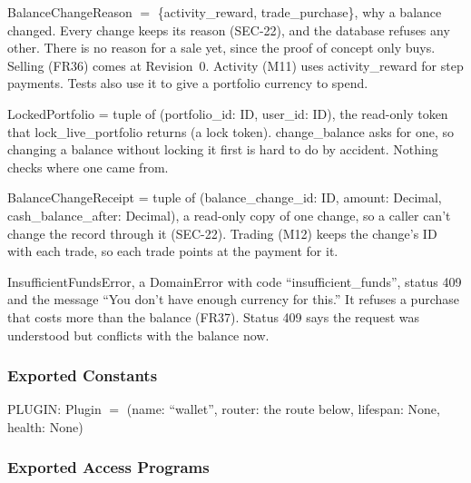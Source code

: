 \documentclass[12pt, titlepage]{article}
\begin{document}
\noindent BalanceChangeReason $=$ \{activity\_reward, trade\_purchase\}, why a
balance changed. Every change keeps its reason (SEC-22), and the database
refuses any other. There is no reason for a sale yet, since the proof of
concept only buys. Selling (FR36) comes at Revision~0. Activity (M11) uses
activity\_reward for step payments. Tests also use it to give a portfolio
currency to spend.

\medskip
{\raggedright
\noindent LockedPortfolio = tuple of (portfolio\_id: ID, user\_id: ID), the
read-only token that lock\_live\_portfolio returns (a lock token).
change\_balance asks for one, so changing a balance without locking it first is
hard to do by accident. Nothing checks where one came from.\par}

\medskip
{\raggedright
\noindent BalanceChangeReceipt = tuple of (balance\_change\_id: ID, amount:
Decimal, cash\_balance\_after: Decimal), a read-only copy of one change, so a
caller can't change the record through it (SEC-22). Trading (M12) keeps the change's ID with
each trade, so each trade points at the payment for it.\par}

\medskip
\noindent InsufficientFundsError, a DomainError with code
``insufficient\_funds'', status 409 and the message ``You don't have enough
currency for this.'' It refuses a purchase that costs more than the balance
(FR37). Status 409 says the request was understood but conflicts with the
balance now.

\subsubsection{Exported Constants}

\noindent PLUGIN: Plugin $=$ (name: ``wallet'', router: the route below,
lifespan: None, health: None)

\subsubsection{Exported Access Programs}
\end{document}
